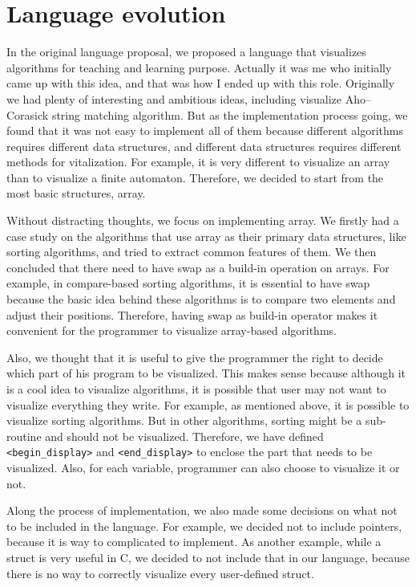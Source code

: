 \section{Language evolution}

In the original language proposal, we proposed a language that visualizes algorithms for teaching
and learning purpose. Actually it was me who initially came up with this idea, and that was how I
ended up with this role. Originally we had plenty of interesting and ambitious ideas, including
visualize Aho–Corasick string matching algorithm. But as the implementation process going, we found
that it was not easy to implement all of them because different algorithms requires different data
structures, and different data structures requires different methods for vitalization. For example,
it is very different to visualize an array than to visualize a finite automaton. Therefore, we
decided to start from the most basic structures, array. 

Without distracting thoughts, we focus on implementing array. We firstly had a case study on the
algorithms that use array as their primary data structures, like sorting algorithms, and tried to
extract common features of them. We then concluded that there need to have swap as a build-in
operation on arrays. For example, in compare-based sorting algorithms, it is essential to have swap
because the basic idea behind these algorithms is to compare two elements and adjust their
positions. Therefore, having swap as build-in operator makes it convenient for the programmer to
visualize array-based algorithms. 

Also, we thought that it is useful to give the programmer the right to decide which part of his
program to be visualized. This makes sense because although it is a cool idea to visualize
algorithms, it is possible that user may not want to visualize everything they write. For example,
as mentioned above, it is possible to visualize sorting algorithms. But in other algorithms, sorting
might be a sub-routine and should not be visualized. Therefore, we have defined
\verb"<begin_display>" and \verb"<end_display>" to enclose the part that needs to be visualized.
Also, for each variable, programmer can also choose to visualize it or not. 

Along the process of implementation, we also made some decisions on what not to be included in the
language. For example, we decided not to include pointers, because it is way to complicated to
implement. As another example, while a struct is very useful in C, we decided to not include that in
our language, because there is no way to correctly visualize every user-defined struct. 

